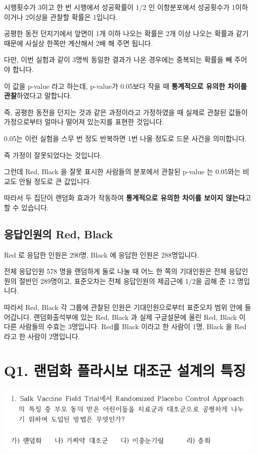 \documentclass[
]{book}
\begin{document}
시행횟수가 3이고 한 번 시행에서 성공확률이 1/2 인 이항분포에서 성공횟수가 1이하이거나 2이상을 관찰할 확률은 1입니다.

공평한 동전 던지기에서 앞면이 1개 이하 나오는 확률은 2개 이상 나오는 확률과 같기 때문에 사실상 한쪽만 계산해서 2배 해 주면 됩니다.

다만, 이번 실험과 같이 3명씩 동일한 결과가 나온 경우에는 중복되는 확률을 빼 주어야 합니다.

이 값을 p-value 라고 하는데, p-value가 0.05보다 작을 때 \textbf{통계적으로 유의한 차이를 관찰}하였다고 말합니다.

즉, 공평한 동전을 던지는 것과 같은 과정이라고 가정하였을 때 실제로 관찰된 값들이 가정으로부터 얼마나 떨어져 있는지를 표현한 것입니다.

0.05는 이런 실험을 스무 번 정도 반복하면 1번 나올 정도로 드문 사건을 의미합니다.

즉 가정이 잘못되었다는 것입니다.

그런데 Red, Black 을 잘못 표시한 사람들의 분포에서 관찰된 p-value 는 0.05와는 비교도 안될 정도로 큰 값입니다.

따라서 두 집단이 랜덤화 효과가 작동하여 \textbf{통계적으로 유의한 차이를 보이지 않는다}고 할 수 있습니다.

\subsection{응답인원의 Red, Black}\label{uxc751uxb2f5uxc778uxc6d0uxc758-red-black-8}

Red 로 응답한 인원은 290명, Black 에 응답한 인원은 288명입니다.

전체 응답인원 578 명을 랜덤하게 둘로 나눌 때 어느 한 쪽의 기대인원은 전체 응답인원의 절반인 289명이고, 표준오차는 전체 응답인원의 제곱근에 1/2을 곱해 준 12 명입니다.

따라서 Red, Black 각 그룹에 관찰된 인원은 기대인원으로부터 표준오차 범위 안에 들어갑니다. 랜덤화출석부에 있는 Red, Black 과 실제 구글설문에 올린 Red, Black 이 다른 사람들의 수효는 3명입니다. Red를 Black 이라고 한 사람이 1명, Black 을 Red 라고 한 사람이 2명입니다.

\section{Q1. 랜덤화 플라시보 대조군 설계의 특징}\label{q1.-uxb79cuxb364uxd654-uxd50cuxb77cuxc2dcuxbcf4-uxb300uxc870uxad70-uxc124uxacc4uxc758-uxd2b9uxc9d5-1}

\begin{flushleft}\includegraphics[width=0.75\linewidth]{./pics/Quiz180409_01} \end{flushleft}
\end{document}
